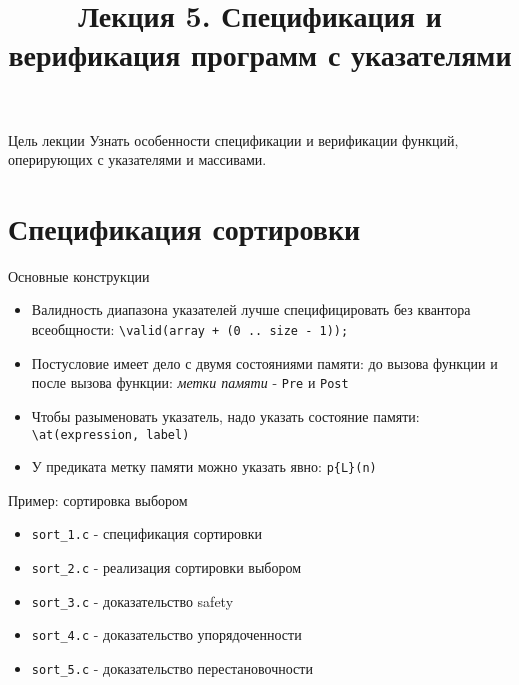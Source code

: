 \documentclass[hyperref={unicode=true}]{beamer}
\title{Лекция 5. Спецификация и верификация программ с указателями}
\author{}
\date{}
\begin{document}
	\begin{frame}{}
		\titlepage
	\end{frame}

    \begin{frame}{Цель лекции}
    Узнать особенности спецификации и верификации функций, оперирующих с
    указателями и массивами.
    \end{frame}

    \section{Спецификация сортировки}

    \begin{frame}{Основные конструкции}
    \begin{itemize}
    \item Валидность диапазона указателей лучше специфицировать без квантора
    всеобщности: \texttt{\textbackslash valid(array + (0 .. size - 1));}
    \item Постусловие имеет дело с двумя состояниями памяти: до вызова функции
    и после вызова функции: \emph{метки памяти} - \texttt{Pre} и \texttt{Post}
    \item Чтобы разыменовать указатель, надо указать состояние памяти:
    \texttt{\textbackslash at(expression, label)}
    \item У предиката метку памяти можно указать явно: \texttt{p\{L\}(n)}
    \end{itemize}
    \end{frame}

    \begin{frame}{Пример: сортировка выбором}
    \begin{itemize}
    \item \texttt{sort\_1.c} - спецификация сортировки
    \item \texttt{sort\_2.c} - реализация сортировки выбором
    \item \texttt{sort\_3.c} - доказательство safety
    \item \texttt{sort\_4.c} - доказательство упорядоченности
    \item \texttt{sort\_5.c} - доказательство перестановочности
    \end{itemize}
    \end{frame}
\end{document}
